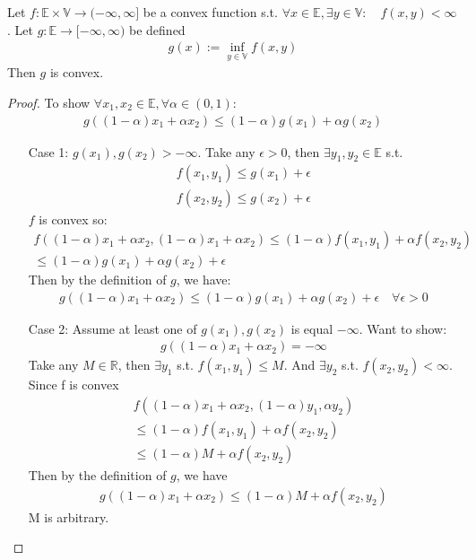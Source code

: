 \documentclass[11pt]{article}
\begin{document}
\begin{theorem}
    Let $f: \mathbb{E}\times \mathbb{V} \to (-\infty,\infty]$ be a convex function s.t.
    $\forall  x \in \mathbb{E}, \exists y \in \mathbb{V}: \quad f(x,y) < \infty$.
    Let $g: \mathbb{E} \to [-\infty,\infty)$ be defined 
    \begin{align*}
        g(x) := \inf_{y \in \mathbb{V}}f(x,y)
    \end{align*}
    Then $g$ is convex.
\end{theorem}
\begin{proof}
    To show $\forall x_1,x_2 \in \mathbb{E}, \forall \alpha \in (0,1)$:
    \begin{align*}
        g((1-\alpha)x_1 + \alpha x_2) \le (1-\alpha)g(x_1) + \alpha g(x_2)
    \end{align*}
    \begin{enumerate}
        \item[Case 1:] $g(x_1),g(x_2) > -\infty$. Take any $\epsilon > 0$, then $\exists 
        y_1,y_2 \in \mathbb{E}$ s.t.
        \begin{align*}
            f(x_1,y_1) \le g(x_1) + \epsilon\\
            f(x_2,y_2) \le g(x_2) + \epsilon
        \end{align*}
        $f$ is convex so:
        \begin{align*}
            f((1-\alpha)x_1+\alpha x_2, (1-\alpha)x_1 + \alpha x_2) \le (1-\alpha)f(x_1,y_1) + \alpha
            f(x_2,y_2) \\
            \le (1-\alpha)g(x_1) + \alpha g(x_2) + \epsilon
        \end{align*}
        Then by the definition of $g$, we have:
        \begin{align*}
            g((1-\alpha)x_1 + \alpha x_2) \le (1-\alpha)g(x_1) + \alpha g(x_2) + \epsilon
            \quad \forall \epsilon > 0
        \end{align*}
        \item[Case 2:] Assume at least one of $g(x_1), g(x_2)$ is equal $-\infty$. Want to show:
        \begin{align*}
            g((1-\alpha)x_1 + \alpha x_2) = -\infty
        \end{align*}
        Take any $M \in \mathbb{R}$, then $\exists y_1 $ s.t. $f(x_1,y_1) \le M$.
        And $\exists y_2$ s.t. $f(x_2,y_2) < \infty$. Since f is convex
        \begin{align*}
            f((1-\alpha)x_1 + \alpha x_2, (1-\alpha)y_1, \alpha y_2) \\
            \le (1-\alpha)f(x_1,y_1) + \alpha f(x_2,y_2) \\
            \le (1-\alpha)M + \alpha f(x_2,y_2)
        \end{align*}
        Then by the definition of $g$, we have
        \begin{align*}
            g((1-\alpha)x_1 + \alpha x_2) \le (1-\alpha)M + \alpha f(x_2,y_2)
        \end{align*}
        M is arbitrary.
    \end{enumerate}
\end{proof}
\end{document}
